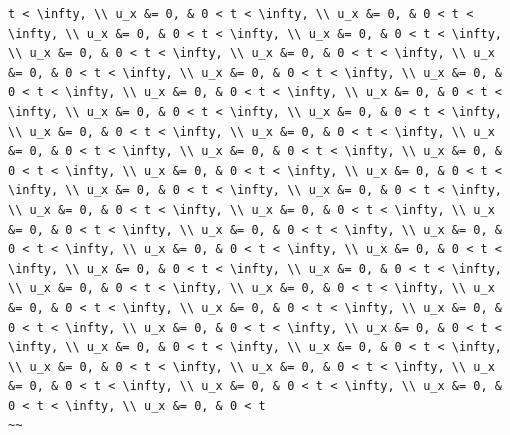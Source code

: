 \documentclass[
  ukrainian,
]{article}
\begin{document}
\begin{verbatim}
t < \infty, \\ u_x &= 0, & 0 < t < \infty, \\ u_x &= 0, & 0 < t < \infty, \\ u_x &= 0, & 0 < t < \infty, \\ u_x &= 0, & 0 < t < \infty, \\ u_x &= 0, & 0 < t < \infty, \\ u_x &= 0, & 0 < t < \infty, \\ u_x &= 0, & 0 < t < \infty, \\ u_x &= 0, & 0 < t < \infty, \\ u_x &= 0, & 0 < t < \infty, \\ u_x &= 0, & 0 < t < \infty, \\ u_x &= 0, & 0 < t < \infty, \\ u_x &= 0, & 0 < t < \infty, \\ u_x &= 0, & 0 < t < \infty, \\ u_x &= 0, & 0 < t < \infty, \\ u_x &= 0, & 0 < t < \infty, \\ u_x &= 0, & 0 < t < \infty, \\ u_x &= 0, & 0 < t < \infty, \\ u_x &= 0, & 0 < t < \infty, \\ u_x &= 0, & 0 < t < \infty, \\ u_x &= 0, & 0 < t < \infty, \\ u_x &= 0, & 0 < t < \infty, \\ u_x &= 0, & 0 < t < \infty, \\ u_x &= 0, & 0 < t < \infty, \\ u_x &= 0, & 0 < t < \infty, \\ u_x &= 0, & 0 < t < \infty, \\ u_x &= 0, & 0 < t < \infty, \\ u_x &= 0, & 0 < t < \infty, \\ u_x &= 0, & 0 < t < \infty, \\ u_x &= 0, & 0 < t < \infty, \\ u_x &= 0, & 0 < t < \infty, \\ u_x &= 0, & 0 < t < \infty, \\ u_x &= 0, & 0 < t < \infty, \\ u_x &= 0, & 0 < t < \infty, \\ u_x &= 0, & 0 < t < \infty, \\ u_x &= 0, & 0 < t < \infty, \\ u_x &= 0, & 0 < t < \infty, \\ u_x &= 0, & 0 < t < \infty, \\ u_x &= 0, & 0 < t < \infty, \\ u_x &= 0, & 0 < t < \infty, \\ u_x &= 0, & 0 < t < \infty, \\ u_x &= 0, & 0 < t < \infty, \\ u_x &= 0, & 0 < t < \infty, \\ u_x &= 0, & 0 < t < \infty, \\ u_x &= 0, & 0 < t < \infty, \\ u_x &= 0, & 0 < t < \infty, \\ u_x &= 0, & 0 < t
~~


\end{verbatim}
\end{document}
